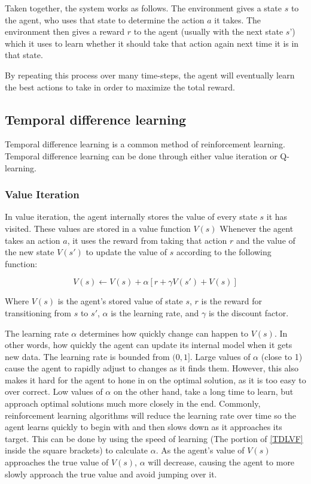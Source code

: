 \documentclass[12pt]{thesis}
\begin{document}
Taken together, the system works as follows. The environment gives a state $s$ to the agent, who uses that state to determine the action $a$ it takes. The environment then gives a reward $r$ to the agent (usually with the next state $s’$) which it uses to learn whether it should take that action again next time it is in that state.

By repeating this process over many time-steps, the agent will eventually learn the best actions to take in order to maximize the total reward.

\subsection{Temporal difference learning}
Temporal difference learning is a common method of reinforcement learning. Temporal difference learning can be done through either value iteration or Q-learning.
\subsubsection{Value Iteration}
In value iteration, the agent internally stores the value of every state $s$ it has visited. These values are stored in a value function $V(s)$ Whenever the agent takes an action $a$, it uses the reward from taking that action $r$ and the value of the new state $V(s')$ to update the value of $s$ according to the following function:

\begin{equation}
V(s) \leftarrow V(s) + \alpha [r + \gamma V(s') + V(s)]
\label{TDLVF}
\end{equation}

Where $V(s)$ is the agent's stored value of state $s$, $r$ is the reward for transitioning from $s$ to $s'$, $\alpha$ is the learning rate, and $\gamma$ is the discount factor.

The learning rate $\alpha$ determines how quickly change can happen to $V(s)$. In other words, how quickly the agent can update its internal model when it gets new data. The learning rate is bounded from $(0,1]$. Large values of $\alpha$ (close to 1) cause the agent to rapidly adjust to changes as it finds them. However, this also makes it hard for the agent to hone in on the optimal solution, as it is too easy to over correct. Low values of $\alpha$ on the other hand, take a long time to learn, but approach optimal solutions much more closely in the end. Commonly, reinforcement learning algorithms will reduce the learning rate over time so the agent learns quickly to begin with and then slows down as it approaches its target. This can be done by using the speed of learning (The portion of \ref{TDLVF} inside the square brackets) to calculate $\alpha$. As the agent's value of $V(s)$ approaches the true value of $V(s)$, $\alpha$ will decrease, causing the agent to more slowly approach the true value and avoid jumping over it.
\end{document}
